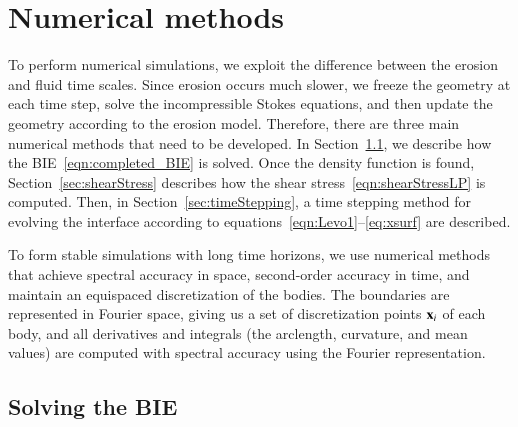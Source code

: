 \documentclass[preprint, 10pt]{elsarticle}
\begin{document}
\section{Numerical methods}
\label{s:method}
To perform numerical simulations, we exploit the difference
between the erosion and fluid time scales.  Since erosion occurs
much slower, we freeze the geometry at each time
step, solve the incompressible Stokes equations, and then update the
geometry according to the erosion model.  Therefore, there are three
main numerical methods that need to be developed.  In
Section~\ref{sec:BIE}, we describe how the BIE~\eqref{eqn:completed_BIE}
is solved.  Once the density function is found,
Section~\ref{sec:shearStress} describes how the shear
stress~\eqref{eqn:shearStressLP} is computed.  Then, in
Section~\ref{sec:timeStepping}, a time stepping method for evolving the
interface according to equations~\eqref{eqn:Levo1}--\eqref{eq:xsurf}
are described. 

To form stable simulations with long time horizons, we use numerical
methods that achieve spectral accuracy in space, second-order accuracy
in time, and maintain an equispaced discretization of the bodies.  The
boundaries are represented in Fourier space, giving us a set of
discretization points ${\mathbf{x}}_i$ of each body, and all derivatives and
integrals (the arclength, curvature, and mean values) are computed with
spectral accuracy using the Fourier representation.

\subsection{Solving the BIE}
\label{sec:BIE}
\end{document}
